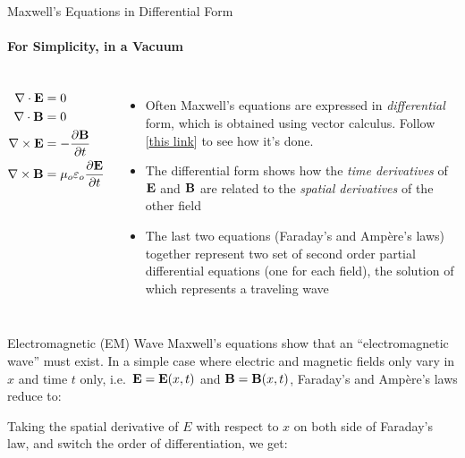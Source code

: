 \documentclass[12pt,aspectratio=169]{beamer}
\newcommand{\eq}[2]{\vspace{#1}{\Large\begin{displaymath}#2\end{displaymath}}}
\begin{document}
\begin{frame}{Maxwell's Equations in Differential Form}
  \framesubtitle{For Simplicity, in a Vacuum}
  \begin{columns}

    {\Large
      \begin{align*}
        \nabla\cdot\mathbf{E} &= 0\\
        \nabla\cdot\mathbf{B} &= 0\\
        \nabla\times\mathbf{E} &=-\frac{\partial\mathbf{B}}{\partial t}\\
        \nabla\times\mathbf{B} &=\mu_o\varepsilon_o\frac{\partial\mathbf{E}}{\partial t}
      \end{align*}
    }

    \begin{itemize}
    \item Often Maxwell's equations are expressed in \emph{differential} form,
      which is obtained using vector calculus. Follow
      [\underline{\href{https://www.wikihow.com/Convert-Maxwell\%27s-Equations-into-Differential-Form}{this link}}]
      to see how it's done.
    \item The differential form shows how the \emph{time derivatives} of
      $\mathbf{E}$ and $\mathbf{B}$ are related to the \emph{spatial derivatives}
      of the other field
    \item The last two equations (Faraday's and Amp\`{e}re's laws) together
      represent two set of second order partial differential equations (one for
      each field), the solution of which represents a traveling wave
    \end{itemize}
  \end{columns}
\end{frame}



\begin{frame}{Electromagnetic (EM) Wave}
  Maxwell's equations show that an ``electromagnetic wave'' must exist. In a
  simple case where electric and magnetic fields only vary in
  $x$ and time $t$ only, i.e.\ $\mathbf{E}=\mathbf{E}(x,t)$ and $\mathbf{B}=\mathbf{B}(x,t)$,
  Faraday's and Amp\`{e}re's laws reduce to:

  \eq{-.2in}{
    \frac{\partial E}{\partial x}=-\frac{\partial B}{dt}
    \quad\quad
    \frac{\partial B}{\partial x}=-\mu_0\varepsilon_0\frac{\partial E}{dt}
  }

  Taking the spatial derivative of $E$ with respect to $x$ on both
  side of Faraday's law, and switch the order of differentiation, we get:

  \eq{-.3in}{
      \frac{\partial}{\partial x}
      \left(\frac{\partial E}{\partial x}\right)
      =-\frac{\partial}{\partial x}\left(\frac{\partial B}{\partial t}\right)
      \quad\rightarrow\quad
      \frac{\partial^2E}{\partial x^2}=
      -\frac{\partial}{\partial t}\left(\frac{\partial B}{\partial x}\right)
  }
\end{frame}
\end{document}

